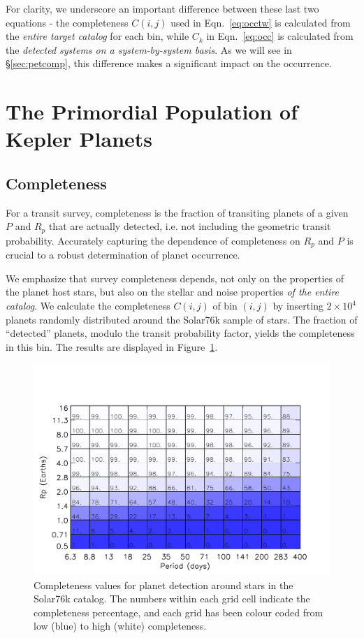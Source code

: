 For clarity, we underscore an important difference between these last
two equations - the completeness $C(i,j)$ used in
Eqn.~\ref{eq:occtw} is calculated from the {\it entire target
catalog} for each bin, while $C_k$ in Eqn.~\ref{eq:occ} is
calculated from the {\it detected systems on a system-by-system
basis}.  As we will see in \S\ref{sec:petcomp}, this
difference makes a significant impact on the occurrence.

\section{The Primordial Population of Kepler Planets}

\subsection{Completeness}
\label{sec:completeness}

For a transit survey, completeness is the fraction of transiting
planets of a given $P$ and $R_p$ that are actually
detected, i.e. not including the geometric transit probability. 
Accurately capturing the dependence of completeness
on $R_p$ and $P$ is crucial to a robust determination of planet
occurrence.

We emphasize that survey completeness depends, not only on
the properties of the planet host stars, but also on the stellar
and noise properties {\it of the entire catalog}.  We calculate
the completeness $C(i,j)$ of bin $(i,j)$ by inserting $2\times
10^4$ planets randomly distributed around the Solar76k
sample of stars. The fraction of ``detected'' planets, modulo the
transit probability factor, yields the completeness in this bin.
The results are displayed in Figure~\ref{fig:sil_compl}.

\begin{figure}
\centerline{\includegraphics[scale=0.55]{chap2/Silburt_completeness.pdf}}
\caption{Completeness values for \kep{} planet detection around stars 
  in the Solar76k catalog. The numbers within each grid cell indicate 
  the completeness percentage, and each grid has been colour coded from low
  (blue) to high (white) completeness.}
\label{fig:sil_compl}
\end{figure}

